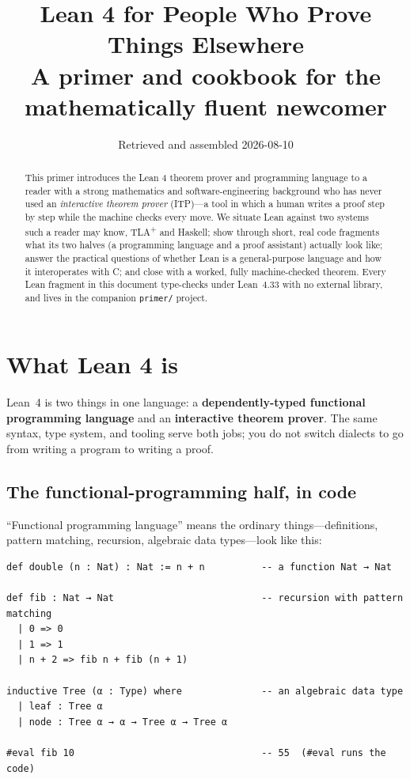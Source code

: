 \documentclass[11pt]{article}
\title{\textbf{Lean 4 for People Who Prove Things Elsewhere}\\[2pt]
  \large A primer and cookbook for the mathematically fluent newcomer}
\author{}
\date{Retrieved and assembled 2026-08-10}
\begin{document}
\maketitle
\vspace{-1.5em}
\begin{abstract}
\noindent This primer introduces the Lean 4 theorem prover and programming
language to a reader with a strong mathematics and software-engineering
background who has never used an \emph{interactive theorem prover} (ITP)---a
tool in which a human writes a proof step by step while the machine checks every
move. We situate Lean against two systems such a reader may know, TLA\textsuperscript{+}
and Haskell; show through short, real code fragments what its two halves (a
programming language and a proof assistant) actually look like; answer the
practical questions of whether Lean is a general-purpose language and how it
interoperates with C; and close with a worked, fully machine-checked theorem.
Every Lean fragment in this document type-checks under Lean~4.33 with no external
library, and lives in the companion \texttt{primer/} project.
\end{abstract}

\tableofcontents
\bigskip

\section{What Lean 4 is}\label{sec:what}
Lean~4 is two things in one language: a \textbf{dependently-typed functional
programming language} and an \textbf{interactive theorem prover}. The same
syntax, type system, and tooling serve both jobs; you do not switch dialects to
go from writing a program to writing a proof.

\subsection{The functional-programming half, in code}\label{sub:fp}
``Functional programming language'' means the ordinary things---definitions,
pattern matching, recursion, algebraic data types---look like this:

\begin{lstlisting}
def double (n : Nat) : Nat := n + n          -- a function Nat → Nat

def fib : Nat → Nat                          -- recursion with pattern matching
  | 0 => 0
  | 1 => 1
  | n + 2 => fib n + fib (n + 1)

inductive Tree (α : Type) where              -- an algebraic data type
  | leaf : Tree α
  | node : Tree α → α → Tree α → Tree α

#eval fib 10                                 -- 55  (#eval runs the code)
\end{lstlisting}
\end{document}
